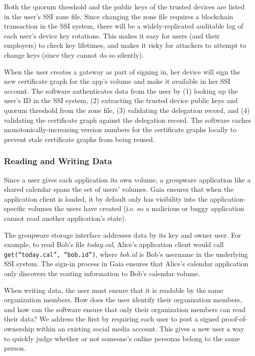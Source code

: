 Both the quorum threshold and the public keys of the
trusted devices are listed in the user's SSI zone file.  Since changing the zone
file requires a blockchain transaction in the SSI system, there will be a
widely-replicated auditable log of each user's device key rotations.  This makes it
easy for users (and their employers) to check key lifetimes, and makes it
risky for attackers to attempt to change keys (since they cannot do so
silently).

When the user creates a gateway as part of signing in, her device will sign the
new certificate graph for the app's volume and make it available in her SSI account.  The
software authenticates data from the user by (1) looking up the user's ID in the
SSI system, (2) extracting the trusted device public keys and quorum threshold
from the zone file, (3) validating the delegation record, and (4) validating the
certificate graph against the delegation record.  The software caches
monotonically-increasing version numbers for the certificate graphs locally to
prevent stale certificate graphs from being reused.

\subsubsection{Reading and Writing Data}

Since a user gives each application its own volume, a groupware application like
a shared calendar spans the set of users' volumes.  Gaia ensures that when the
application client is loaded, it by default only has visibility into the
application-specific volumes the users have created (i.e. so a malicious
or buggy application cannot read another application's state).

The groupware storage interface addresses data by its key and owner user.  For
example, to read Bob's file \textit{today.cal}, Alice's application client would call
\texttt{get(``today.cal'', ``bob.id'')}, where \textit{bob.id} is Bob's username
in the underlying SSI system.  The sign-in process in Gaia
ensures that Alice's calendar application only discovers the routing information 
to Bob's calendar volume.

When writing data, the user must ensure that it is readable by the same
organization members.  How does the user identify their organization members,
and how can the software ensure that only their organization members can read
their data?  We address the first by requiring each user to post a signed
proof-of-ownership within an existing social media account.  This gives a new
user a way to quickly judge whether or not someone's online personas belong to
the same person.

